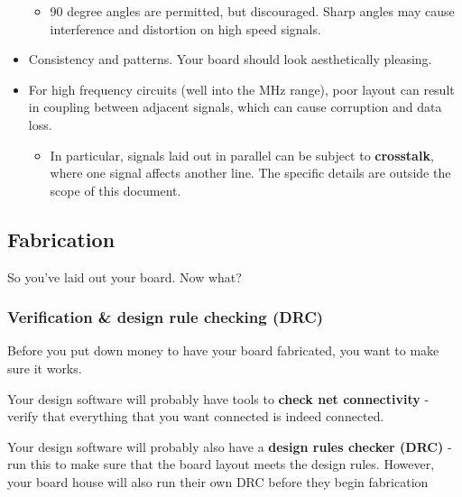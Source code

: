 \documentclass[letterpaper]{article}
\begin{document}
\begin{itemize}
\begin{itemize}
\item {\sffamily\color[rgb]{0.30980393,0.5058824,0.7411765}
90 degree angles are permitted, but discouraged. Sharp angles may cause interference and distortion on high speed
signals.}
\end{itemize}
\item {\sffamily\color[rgb]{0.30980393,0.5058824,0.7411765}
Consistency and patterns. Your board should look aesthetically pleasing.}
\item {\sffamily\color[rgb]{0.30980393,0.5058824,0.7411765}
For high frequency circuits (well into the MHz range), poor layout can result in coupling between adjacent signals,
which can cause corruption and data loss.}

\begin{itemize}
\item {\sffamily\color[rgb]{0.30980393,0.5058824,0.7411765}
In particular, signals laid out in parallel can be subject to \textbf{crosstalk}, where one signal affects another line.
The specific details are outside the scope of this document.}
\end{itemize}
\end{itemize}
\subsection{Fabrication}
\hypertarget{Toc337742686}{}{\sffamily\color[rgb]{0.30980393,0.5058824,0.7411765}
So you've laid out your board. Now what?}

\subsubsection{Verification \& design rule checking (DRC)}
\hypertarget{Toc337742687}{}{\sffamily\color[rgb]{0.30980393,0.5058824,0.7411765}
Before you put down money to have your board fabricated, you want to make sure it works.}

{\sffamily\color[rgb]{0.30980393,0.5058824,0.7411765}
Your design software will probably have tools to \textbf{check net connectivity} - verify that everything that you want
connected is indeed connected.}

{\sffamily\color[rgb]{0.30980393,0.5058824,0.7411765}
Your design software will probably also have a \textbf{design rules checker (DRC)} - run this to make sure that the
board layout meets the design rules. However, your board house will also run their own DRC before they begin
fabrication}
\end{document}
